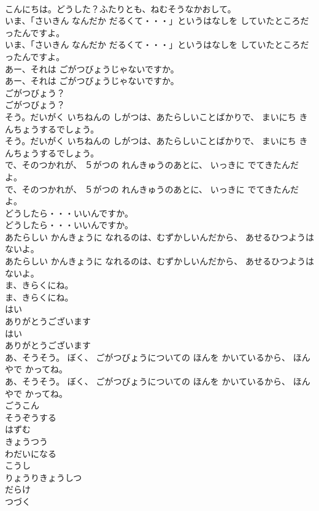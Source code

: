 \documentclass[8pt]{extreport}
\begin{document}
\begin{CJK}{UTF8}{min}
\\	こんにちは。どうした？ふたりとも、ねむそうなかおして。
\\	いま、「さいきん なんだか だるくて・・・」というはなしを していたところだったんですよ。
\\	いま、「さいきん なんだか だるくて・・・」というはなしを していたところだったんですよ。
\\	あー、それは ごがつびょうじゃないですか。
\\	あー、それは ごがつびょうじゃないですか。
\\	ごがつびょう？
\\	ごがつびょう？
\\	そう。だいがく いちねんの しがつは、あたらしいことばかりで、 まいにち きんちょうするでしょう。
\\	そう。だいがく いちねんの しがつは、あたらしいことばかりで、 まいにち きんちょうするでしょう。
\\	で、そのつかれが、 ５がつの れんきゅうのあとに、 いっきに でてきたんだよ。
\\	で、そのつかれが、 ５がつの れんきゅうのあとに、 いっきに でてきたんだよ。
\\	どうしたら・・・いいんですか。
\\	どうしたら・・・いいんですか。
\\	あたらしい かんきょうに なれるのは、むずかしいんだから、 あせるひつようは ないよ。
\\	あたらしい かんきょうに なれるのは、むずかしいんだから、 あせるひつようは ないよ。
\\	ま、きらくにね。
\\	ま、きらくにね。
\\	はい
\\	ありがとうございます
\\	はい
\\	ありがとうございます
\\	あ、そうそう。 ぼく、 ごがつびょうについての ほんを かいているから、 ほんやで かってね。
\\	あ、そうそう。 ぼく、 ごがつびょうについての ほんを かいているから、 ほんやで かってね。
\\	ごうこん
\\	そうぞうする
\\	はずむ
\\	きょうつう
\\	わだいになる
\\	こうし
\\	りょうりきょうしつ
\\	だらけ
\\	つづく

\end{CJK}
\end{document}
